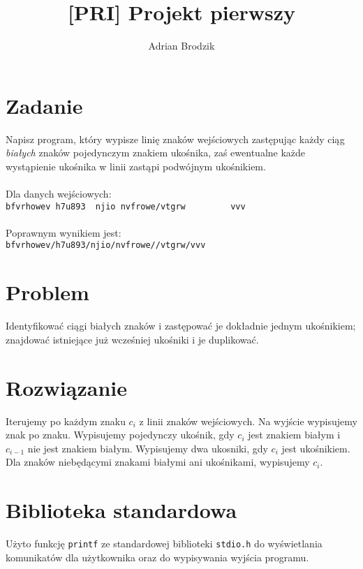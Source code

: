 \documentclass[a4paper, 12pt]{article}
\title{\bf [PRI] Projekt pierwszy}
\author{Adrian Brodzik}
\begin{document}
\maketitle

\section*{Zadanie}
Napisz program, który wypisze linię znaków wejściowych zastępując każdy ciąg \textit{białych} znaków pojedynczym znakiem ukośnika, zaś ewentualne każde wystąpienie ukośnika w linii zastąpi podwójnym ukośnikiem.
\\
\\
Dla danych wejściowych:\\
\lstinline{bfvrhowev h7u893  njio nvfrowe/vtgrw         vvv}
\\
\\
Poprawnym wynikiem jest:\\
\lstinline{bfvrhowev/h7u893/njio/nvfrowe//vtgrw/vvv}

\section*{Problem}
Identyfikować ciągi białych znaków i zastępować je dokładnie jednym ukośnikiem; znajdować istniejące już wcześniej ukośniki i je duplikować.

\section*{Rozwiązanie}
Iterujemy po każdym znaku $c_{i}$ z linii znaków wejściowych. Na wyjście wypisujemy znak po znaku. Wypisujemy pojedynczy ukośnik, gdy $c_{i}$ jest znakiem białym i $c_{i-1}$ nie jest znakiem białym. Wypisujemy dwa ukosniki, gdy $c_{i}$ jest ukośnikiem. Dla znaków niebędącymi znakami białymi ani ukośnikami, wypisujemy $c_{i}$.

\section*{Biblioteka standardowa}
Użyto funkcję \texttt{printf} ze standardowej biblioteki \texttt{stdio.h} do wyświetlania komunikatów dla użytkownika oraz do wypisywania wyjścia programu.
\end{document}
